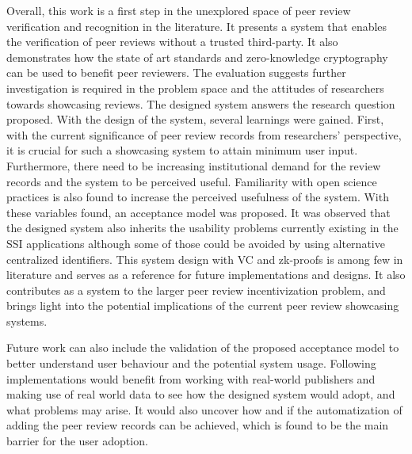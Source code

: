 Overall, this work is a first step in the unexplored space of peer review verification and recognition in the literature. It presents a system that enables the verification of peer reviews without a trusted third-party. It also demonstrates how the state of art standards and zero-knowledge cryptography can be used to benefit peer reviewers. The evaluation suggests further investigation is required in the problem space and the attitudes of researchers towards showcasing reviews. The designed system answers the research question proposed. With the design of the system, several learnings were gained. First, with the current significance of peer review records from researchers' perspective, it is crucial for such a showcasing system to attain minimum user input. Furthermore, there need to be increasing institutional demand for the review records and the system to be perceived useful. Familiarity with open science practices is also found to increase the perceived usefulness of the system. With these variables found, an acceptance model was proposed. It was observed that the designed system also inherits the usability problems currently existing in the \acrshort{SSI} applications although some of those could be avoided by using alternative centralized identifiers. This system design with \acrshort{VC} and \acrshort{zk-proofs} is among few in literature and serves as a reference for future implementations and designs. It also contributes as a system to the larger peer review incentivization problem, and brings light into the potential implications of the current peer review showcasing systems. 

Future work can also include the validation of the proposed acceptance model to better understand user behaviour and the potential system usage. Following implementations would benefit from working with real-world publishers and making use of real world data to see how the designed system would adopt, and what problems may arise. It would also uncover how and if the automatization of adding the peer review records can be achieved, which is found to be the main barrier for the user adoption.